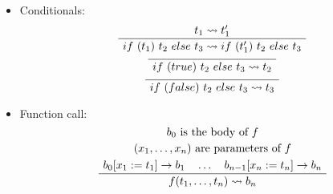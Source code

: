 \begin{exercise}{}
\begin{solution}
\begin{enumerate}
\begin{itemize}
        \item Conditionals:
          \begin{gather*}
            \AxiomC{\(t_1 \leadsto t_1'\)}
            \UnaryInfC{\(if ~(t_1) ~t_2 ~else ~t_3 \leadsto if ~(t_1') ~t_2 ~else ~t_3\)}
            \DisplayProof \\
            \AxiomC{}
            \UnaryInfC{\(if ~(true) ~t_2 ~else ~t_3 \leadsto t_2\)}
            \DisplayProof \\
            \AxiomC{}
            \UnaryInfC{\(if ~(false) ~t_2 ~else ~t_3 \leadsto t_3\)}
            \DisplayProof
          \end{gather*}
        \item Function call:
          \begin{gather*}
            \alwaysNoLine
            \AxiomC{\(b_0\) is the body of \(f\)}
            \UnaryInfC{\((x_1, \ldots, x_n)\) are parameters of \(f\)}
            \UnaryInfC{\(b_0[x_1 := t_1] \to b_1 \quad \ldots \quad b_{n-1}[x_n := t_n] \to b_n\)}
            \alwaysSingleLine
            \UnaryInfC{\(f(t_1, \ldots, t_n) \leadsto b_n\)}
            \DisplayProof
          \end{gather*}
      \end{itemize}


\end{enumerate}
\end{solution}
\end{exercise}
